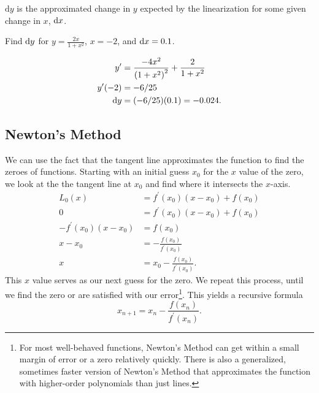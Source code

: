 $\mathrm{d}y$ is the approximated change in $y$ expected by the linearization for some given change in $x$, $\mathrm{d} x$.

\begin{example}
	Find $\mathrm{d} y$ for $y=\frac{2x}{1+x^2}$, $x=-2$, and $\mathrm{d} x = 0.1$.
\end{example}
\begin{answer}
	\begin{align*}
		y^\prime &= \frac{-4x^2}{\left(1+x^2\right)^2} + \frac{2}{1+x^2} \\
		y^\prime(-2) &= -6/25 \\
		\mathrm{d} y &= (-6/25)(0.1) = -0.024.
	\end{align*}
\end{answer}

\subsection{Newton's Method}
We can use the fact that the tangent line approximates the function to find the zeroes of functions.
Starting with an initial guess $x_0$ for the $x$ value of the zero, we look at the the tangent line at $x_0$ and find where it intersects the $x$-axis.
\begin{align*}
	L_0(x) &= f^\prime(x_0)(x - x_0) + f(x_0) \\
	0 &= f^\prime(x_0)(x - x_0) + f(x_0) \\
	-f^\prime(x_0)(x - x_0) &= f(x_0) \\
	x - x_0 &= -\frac{f(x_0)}{f^\prime(x_0)} \\
	x &= x_0 - \frac{f(x_0)}{f^\prime(x_0)}.
\end{align*}
This $x$ value serves as our next guess for the zero.
We repeat this process, until we find the zero or are satisfied with our error\footnote{For most well-behaved functions, Newton's Method can get within a small margin of error or a zero relatively quickly. There is also a generalized, sometimes faster version of Newton's Method that approximates the function with higher-order polynomials than just lines.}.
This yields a recursive formula
\begin{equation*}
	x_{n+1} = x_n - \frac{f(x_n)}{f^\prime(x_n)}.
\end{equation*}